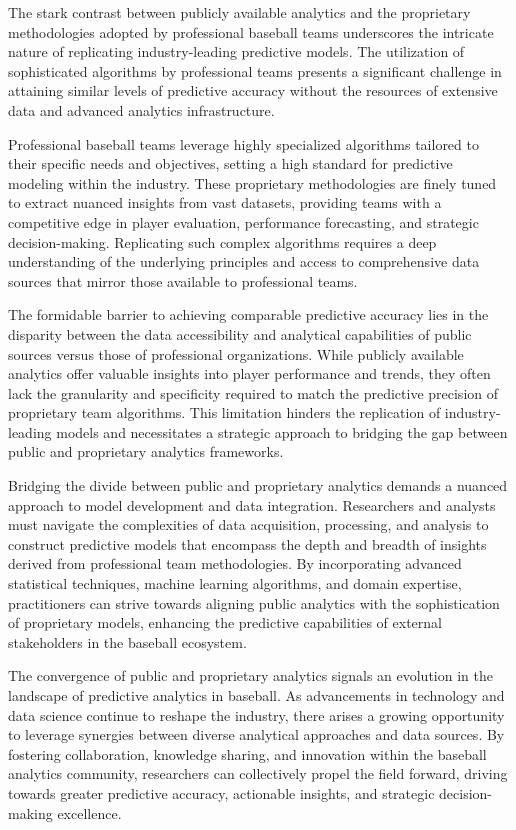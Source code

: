 \documentclass[12pt, english]{article}
\begin{document}
The stark contrast between publicly available analytics and the proprietary methodologies adopted by professional baseball teams underscores the intricate nature of replicating industry-leading predictive models. The utilization of sophisticated algorithms by professional teams presents a significant challenge in attaining similar levels of predictive accuracy without the resources of extensive data and advanced analytics infrastructure.

Professional baseball teams leverage highly specialized algorithms tailored to their specific needs and objectives, setting a high standard for predictive modeling within the industry. These proprietary methodologies are finely tuned to extract nuanced insights from vast datasets, providing teams with a competitive edge in player evaluation, performance forecasting, and strategic decision-making. Replicating such complex algorithms requires a deep understanding of the underlying principles and access to comprehensive data sources that mirror those available to professional teams.

The formidable barrier to achieving comparable predictive accuracy lies in the disparity between the data accessibility and analytical capabilities of public sources versus those of professional organizations. While publicly available analytics offer valuable insights into player performance and trends, they often lack the granularity and specificity required to match the predictive precision of proprietary team algorithms. This limitation hinders the replication of industry-leading models and necessitates a strategic approach to bridging the gap between public and proprietary analytics frameworks.

Bridging the divide between public and proprietary analytics demands a nuanced approach to model development and data integration. Researchers and analysts must navigate the complexities of data acquisition, processing, and analysis to construct predictive models that encompass the depth and breadth of insights derived from professional team methodologies. By incorporating advanced statistical techniques, machine learning algorithms, and domain expertise, practitioners can strive towards aligning public analytics with the sophistication of proprietary models, enhancing the predictive capabilities of external stakeholders in the baseball ecosystem.

The convergence of public and proprietary analytics signals an evolution in the landscape of predictive analytics in baseball. As advancements in technology and data science continue to reshape the industry, there arises a growing opportunity to leverage synergies between diverse analytical approaches and data sources. By fostering collaboration, knowledge sharing, and innovation within the baseball analytics community, researchers can collectively propel the field forward, driving towards greater predictive accuracy, actionable insights, and strategic decision-making excellence.
\end{document}
